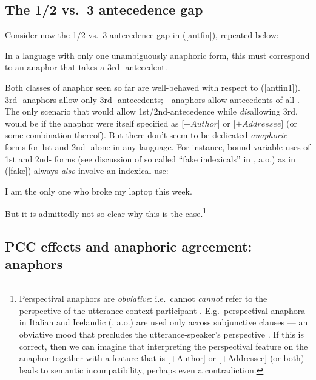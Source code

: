 \documentclass[output=paper, modfonts, nonflat]{langsci/langscibook}
\begin{document}
\subsection{The 1/2 vs.\ 3 antecedence gap}

Consider now the 1/2 vs.\ 3 antecedence gap in (\ref{antfin}), repeated
below: 

\ea\label{antfin1} In a language with only one unambiguously anaphoric
form, this must correspond to an anaphor that takes a 3rd-\person{}
antecedent.  \z 

\noindent Both classes of anaphor seen so far are well-behaved with respect to
(\ref{antfin1}).  3rd-\person{} anaphors allow only 3rd-\person{}
antecedents; \nul-\person{} anaphors allow antecedents of all
\person. The only scenario that would allow 1st/2nd-antecedence while
\emph{dis}allowing 3rd, would be if the anaphor were itself specified
as [$+Author$] or [$+Addressee$] (or some combination thereof). But
there don't seem to be dedicated \emph{anaphoric} forms for 1st and
2nd-\person{} alone in any language. For instance, bound-variable uses
of 1st and 2nd-\person{} forms (see discussion of so called
``fake indexicals'' in \citealt{vonstechow:2002, kratzer:2009}, a.o.) as in
(\ref{fake}) always {\em also} involve an indexical use: \vspace{-1ex}

\ea\label{fake} I am the only one who broke my laptop this week.  \z

\noindent But it is admittedly not so clear why this is the case.\footnote{
  Perspectival anaphors are {\em obviative}: i.e.\ cannot {\em cannot}
  refer to the perspective of the utterance-context participant
  \citep{sundaresan:2012, sundaresanpearson:2014,
    sundaresan:2018}. E.g.\ perspectival anaphora in Italian
  \citep{giorgi:2010} and Icelandic (\citealt{Hicks:2009,
    Reuland:2011}, a.o.) are used only across subjunctive clauses --- an
  obviative mood that precludes the utterance-speaker's perspective
  \citep{hellan:1988, sigurdsson:2010}. If this is correct, then we
  can imagine that interpreting the perspectival feature on the
  anaphor together with a feature that is [+Author] or [+Addressee]
  (or both) leads to semantic incompatibility, perhaps even a
  contradiction.}




\subsection{PCC effects and anaphoric agreement:  anaphors}
\end{document}
